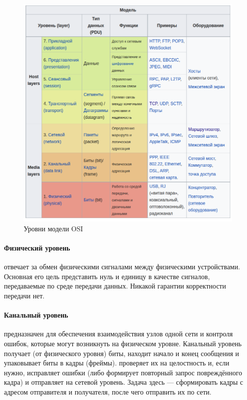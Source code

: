 \begin{figure}[H] \centering
	\includegraphics[scale = 0.6]{17/OSI.png}
	\caption{Уровни модели OSI}
\end{figure}

\paragraph*{Физический уровень}\label{b17:osi:lev1} отвечает за обмен физическими сигналами между физическими устройствами. Основная его цель представить нуль и единицу в качестве сигналов, передаваемые по среде передачи данных. Никакой гарантии корректности передачи нет.

\paragraph*{Канальный уровень}\label{b17:osi:lev2} предназначен для обеспечения взаимодействия узлов одной сети и контроля ошибок, которые могут возникнуть на физическом уровне. Канальный уровень получает (от физического уровня) биты, находит начало и конец сообщения и упаковывает биты в кадры (фреймы). проверяет их на целостность и, если нужно, исправляет ошибки (либо формирует повторный запрос повреждённого кадра) и отправляет на сетевой уровень. Задача здесь — сформировать кадры с адресом отправителя и получателя, после чего отправить их по сети.

